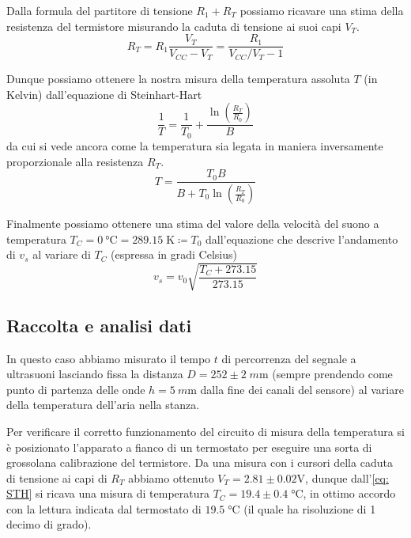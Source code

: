 \documentclass[10pt, a4paper, italian]{article}
\begin{document}
Dalla formula del partitore di tensione $R_1 + R_T$ possiamo ricavare una
stima della resistenza del termistore misurando la caduta di tensione ai suoi
capi $V_T$.
\begin{equation}
R_T = R_1 \frac{V_T}{V_{CC} - V_T} = \frac{R_1}{V_{CC}/V_T - 1}
\end{equation}

Dunque possiamo ottenere la nostra misura della temperatura assoluta $T$
(in Kelvin) dall'equazione di Steinhart-Hart
\begin{equation}\label{eq: STH}
\frac{1}{T} = \frac{1}{T_0} + \frac{\ln{\left(\frac{R_T}{R_0}\right)}}{B}
\end{equation}
da cui si vede ancora come la temperatura sia legata in maniera inversamente
proporzionale alla resistenza $R_T$.
\begin{equation}
T = \frac{T_0 B}{B + T_0 \ln\left({\frac{R_T}{R_0}}\right)}
\end{equation}

Finalmente possiamo ottenere una stima del valore della velocità del suono a
temperatura $T_C = \SI{0}{\degreeCelsius} = 289.15 \; \si{\K} \coloneqq T_0$
dall'equazione che descrive l'andamento di $v_s$ al variare di $T_C$
(espressa in gradi Celsius)
\begin{equation}\label{eq: v(T)}
v_s = v_0 \sqrt{\frac{T_C + 273.15}{273.15}}
\end{equation}

\subsection{Raccolta e analisi dati}
In questo caso abbiamo misurato il tempo $t$ di percorrenza del segnale a
ultrasuoni lasciando fissa la distanza $D = 252 \pm 2 \; \si{m\m}$
(sempre prendendo come punto di partenza delle onde $h = \SI{5}{m\m}$ dalla
fine dei canali del sensore) al variare della temperatura dell'aria nella
stanza.

Per verificare il corretto funzionamento del circuito di misura della
temperatura si è posizionato l'apparato a fianco di un termostato per eseguire
una sorta di grossolana calibrazione del termistore.
Da una misura con i cursori della caduta di tensione ai capi di $R_T$ abbiamo
ottenuto $V_T = 2.81 \pm 0.02 \si{\V}$, dunque dall'\cref{eq: STH} si ricava
una misura di temperatura $T_C = 19.4 \pm 0.4 \; \si{\degreeCelsius}$, in
ottimo accordo con la lettura indicata dal termostato di
$19.5 \; \si{\degreeCelsius}$ (il quale ha risoluzione di 1 decimo di grado).
\end{document}
